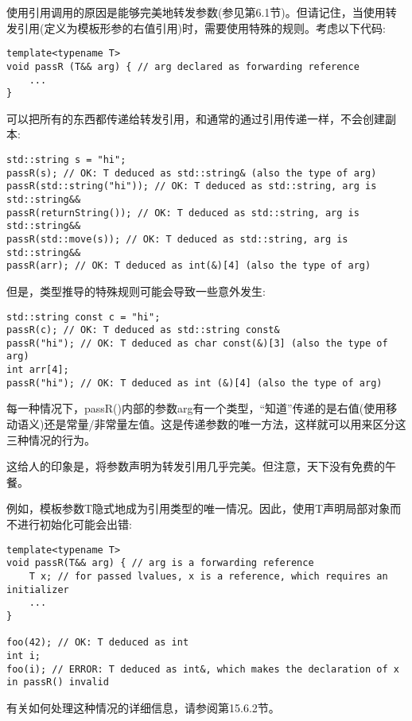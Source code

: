 
使用引用调用的原因是能够完美地转发参数(参见第6.1节)。但请记住，当使用转发引用(定义为模板形参的右值引用)时，需要使用特殊的规则。考虑以下代码:

\begin{lstlisting}[style=styleCXX]
template<typename T>
void passR (T&& arg) { // arg declared as forwarding reference
	...
}
\end{lstlisting}

可以把所有的东西都传递给转发引用，和通常的通过引用传递一样，不会创建副本:

\begin{lstlisting}[style=styleCXX]
std::string s = "hi";
passR(s); // OK: T deduced as std::string& (also the type of arg)
passR(std::string("hi")); // OK: T deduced as std::string, arg is std::string&&
passR(returnString()); // OK: T deduced as std::string, arg is std::string&&
passR(std::move(s)); // OK: T deduced as std::string, arg is std::string&&
passR(arr); // OK: T deduced as int(&)[4] (also the type of arg)
\end{lstlisting}

但是，类型推导的特殊规则可能会导致一些意外发生:

\begin{lstlisting}[style=styleCXX]
std::string const c = "hi";
passR(c); // OK: T deduced as std::string const&
passR("hi"); // OK: T deduced as char const(&)[3] (also the type of arg)
int arr[4];
passR("hi"); // OK: T deduced as int (&)[4] (also the type of arg)
\end{lstlisting}

每一种情况下，passR()内部的参数arg有一个类型，“知道”传递的是右值(使用移动语义)还是常量/非常量左值。这是传递参数的唯一方法，这样就可以用来区分这三种情况的行为。

这给人的印象是，将参数声明为转发引用几乎完美。但注意，天下没有免费的午餐。

例如，模板参数T隐式地成为引用类型的唯一情况。因此，使用T声明局部对象而不进行初始化可能会出错:

\begin{lstlisting}[style=styleCXX]
template<typename T>
void passR(T&& arg) { // arg is a forwarding reference
	T x; // for passed lvalues, x is a reference, which requires an initializer
	...
}

foo(42); // OK: T deduced as int
int i;
foo(i); // ERROR: T deduced as int&, which makes the declaration of x in passR() invalid
\end{lstlisting}

有关如何处理这种情况的详细信息，请参阅第15.6.2节。




















